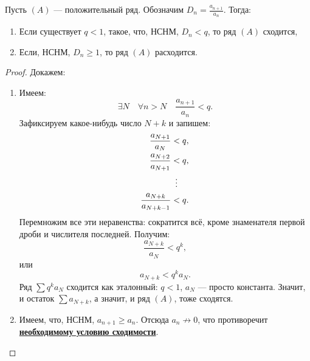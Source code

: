 \begin{theorem}[noob] \hypertarget{Даламбер-нуб}{}
	Пусть \((A)\) --- положительный ряд. Обозначим \linebreak \(D_n = \frac{a_{n+1}}{a_n}\). Тогда:
	\begin{enumerate}
		\item Если существует \(q < 1\), такое, что, НСНМ, \(D_n < q\), то ряд \((A)\) сходится,
		\item Если, НСНМ, \(D_n \geqslant 1\), то ряд \((A)\) расходится. 
	\end{enumerate}
\end{theorem}
\begin{proof}
	Докажем:
	\begin{enumerate}
		\item Имеем: \[
		\exists N \quad \forall n > N \quad \frac{a_{n+1}}{a_n} < q.
		\]
		Зафиксируем какое-нибудь число \(N + k\) и запишем:
		\begin{align*}
			\frac{a_{N+1}}{a_N} 	  &< q, 		   \\
			\frac{a_{N+2}}{a_{N+1}}   &< q, 		   \\
			& \enskip \vdots \\
			\frac{a_{N+k}}{a_{N+k-1}} &<q. 			   \\
		\end{align*}
		Перемножим все эти неравенства: сократится всё, кроме знаменателя первой дроби и числителя последней. Получим: \[
		\frac{a_{N+k}}{a_N} < q^k,
		\]
		или \[
		a_{N+k} < q^k a_N.
		\]
		Ряд \(\sum q^k a_N\) сходится как эталонный: \(q < 1\), \(a_N\) --- просто константа. Значит, и остаток \(\sum a_{N+k}\), а значит, и ряд \((A)\), тоже сходятся.
		\item Имеем, что, НСНМ, \(a_{n+1} \geqslant a_n\). Отсюда \(a_n \not\to 0\), что противоречит \hyperlink{необходимое условие сходимости}{\bfseries необходимому условию сходимости}.
	\end{enumerate}
\end{proof}

